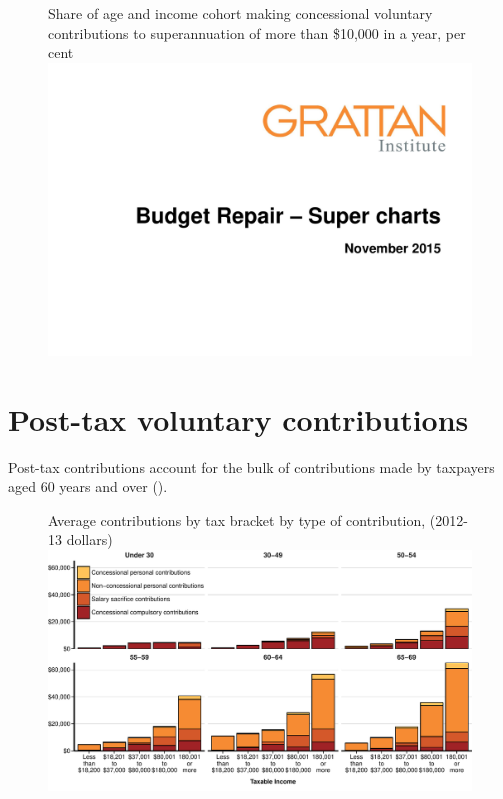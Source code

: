 \begin{subappendices}
\begin{figure}
%
{Share of age and income cohort making concessional voluntary contributions to superannuation of more than \$10,000 in a year, per cent}\label{fig:SUPER-A-7}
\includegraphics[width=\columnwidth,page=41]{super-atlas/PPTX.pdf}
\end{figure}

\section{Post-tax voluntary contributions}
Post-tax contributions account for the bulk of contributions made by taxpayers aged 60 years and over (). 
\begin{figure}
%
{Average contributions by tax bracket by type of contribution, (2012-13 dollars)}\label{fig:SUPER-A-8}
\includegraphics[width=\textwidth]{super-atlas/appendices/figure/A8-1.pdf}
\end{figure}


\end{subappendices}
